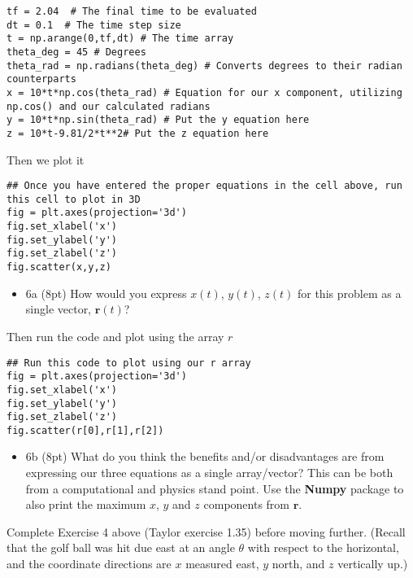 \documentclass[%
oneside,                 %
final,                   %
10pt]{article}
\begin{document}
\begin{verbatim}
tf = 2.04  # The final time to be evaluated
dt = 0.1  # The time step size
t = np.arange(0,tf,dt) # The time array
theta_deg = 45 # Degrees
theta_rad = np.radians(theta_deg) # Converts degrees to their radian counterparts
x = 10*t*np.cos(theta_rad) # Equation for our x component, utilizing np.cos() and our calculated radians
y = 10*t*np.sin(theta_rad) # Put the y equation here
z = 10*t-9.81/2*t**2# Put the z equation here
\end{verbatim}
Then we plot it
\begin{verbatim}
## Once you have entered the proper equations in the cell above, run this cell to plot in 3D
fig = plt.axes(projection='3d')
fig.set_xlabel('x')
fig.set_ylabel('y')
fig.set_zlabel('z')
fig.scatter(x,y,z)
\end{verbatim}

\begin{itemize}
\item 6a (8pt) How would you express $x(t)$, $y(t)$, $z(t)$ for this problem as a single vector, $\bm{r}(t)$?
\end{itemize}

\noindent
Then run the code and plot using the array $r$
\begin{verbatim}
## Run this code to plot using our r array 
fig = plt.axes(projection='3d')
fig.set_xlabel('x')
fig.set_ylabel('y')
fig.set_zlabel('z')
fig.scatter(r[0],r[1],r[2])
\end{verbatim}

\begin{itemize}
\item 6b (8pt) What do you think the benefits and/or disadvantages are from expressing our three equations as a single array/vector? This can be both from a computational and physics stand point. Use the \textbf{Numpy} package to also print the maximum $x$, $y$ and $z$ components from $\bm{r}$.
\end{itemize}

\noindent
Complete Exercise 4 above (Taylor exercise 1.35) before moving further. (Recall that the golf ball was hit due east at an angle $\theta$ with respect to the horizontal, and the coordinate directions are $x$ measured east, $y$ north, and $z$ vertically up.)
\end{document}
